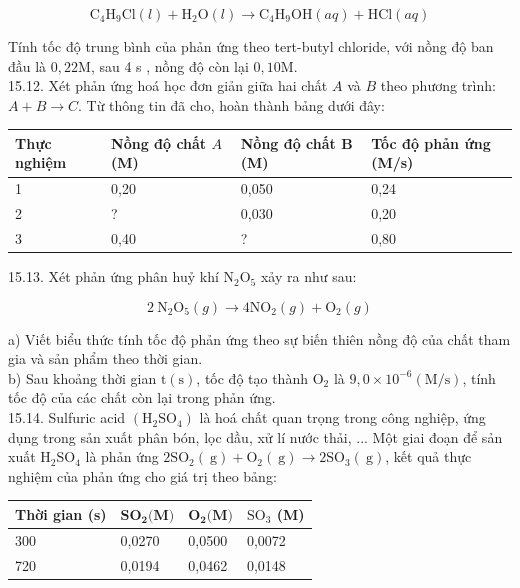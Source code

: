\documentclass[10pt]{article}
\begin{document}
$$
\mathrm{C}_{4} \mathrm{H}_{9} \mathrm{Cl}(l)+\mathrm{H}_{2} \mathrm{O}(l) \rightarrow \mathrm{C}_{4} \mathrm{H}_{9} \mathrm{OH}(a q)+\mathrm{HCl}(a q)
$$

Tính tốc độ trung bình của phản ứng theo tert-butyl chloride, với nồng độ ban đầu là $0,22 \mathrm{M}$, sau 4 s , nồng độ còn lại $0,10 \mathrm{M}$.\\
15.12. Xét phản ứng hoá học đơn giản giữa hai chất $A$ và $B$ theo phương trình: $A+B \rightarrow C$. Từ thông tin đã cho, hoàn thành bảng dưới đây:

\begin{center}
\begin{tabular}{|l|l|l|l|}
\hline
Thực nghiệm & Nồng độ chất $A$ (M) & Nồng độ chất B (M) & Tốc độ phản ứng (M/s) \\
\hline
1 & 0,20 & 0,050 & 0,24 \\
\hline
2 & ? & 0,030 & 0,20 \\
\hline
3 & 0,40 & ? & 0,80 \\
\hline
\end{tabular}
\end{center}

15.13. Xét phản ứng phân huỷ khí $\mathrm{N}_{2} \mathrm{O}_{5}$ xảy ra như sau:

$$
2 \mathrm{~N}_{2} \mathrm{O}_{5}(g) \rightarrow 4 \mathrm{NO}_{2}(g)+\mathrm{O}_{2}(g)
$$

a) Viết biểu thức tính tốc độ phản ứng theo sự biến thiên nồng độ của chất tham gia và sản phẩm theo thời gian.\\
b) Sau khoảng thời gian $\mathrm{t}(\mathrm{s})$, tốc độ tạo thành $\mathrm{O}_{2}$ là $9,0 \times 10^{-6}(\mathrm{M} / \mathrm{s})$, tính tốc độ của các chất còn lại trong phản ứng.\\
15.14. Sulfuric acid $\left(\mathrm{H}_{2} \mathrm{SO}_{4}\right)$ là hoá chất quan trọng trong công nghiệp, ứng dụng trong sản xuất phân bón, lọc dầu, xử lí nước thải, ... Một giai đoạn để sản xuất $\mathrm{H}_{2} \mathrm{SO}_{4}$ là phản ứng $2 \mathrm{SO}_{2}(\mathrm{~g})+\mathrm{O}_{2}(\mathrm{~g}) \rightarrow 2 \mathrm{SO}_{3}(\mathrm{~g})$, kết quả thực nghiệm của phản ứng cho giá trị theo bảng:

\begin{center}
\begin{tabular}{|l|l|l|l|}
\hline
Thời gian (s) & $\mathbf{S O}_{\mathbf{2}} \boldsymbol{(} \mathbf{M} \boldsymbol{)}$ & $\mathbf{O}_{\mathbf{2}} \boldsymbol{(} \mathbf{M} \boldsymbol{)}$ & $\mathrm{SO}_{3}$ (M) \\
\hline
300 & 0,0270 & 0,0500 & 0,0072 \\
\hline
720 & 0,0194 & 0,0462 & 0,0148 \\
\hline
\end{tabular}
\end{center}
\end{document}
